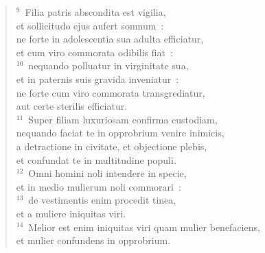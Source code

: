 \begin{flushleft}\begin{verse}${}^{9}$~Filia patris abscondita est vigilia,\\ et sollicitudo ejus aufert somnum~:\\ ne forte in adolescentia sua adulta efficiatur,\\ et cum viro commorata odibilis fiat~:\\
${}^{10}$~nequando polluatur in virginitate sua,\\ et in paternis suis gravida inveniatur~:\\ ne forte cum viro commorata transgrediatur,\\ aut certe sterilis efficiatur.\\
${}^{11}$~Super filiam luxuriosam confirma custodiam,\\ nequando faciat te in opprobrium venire inimicis,\\ a detractione in civitate, et objectione plebis,\\ et confundat te in multitudine populi.\\
${}^{12}$~Omni homini noli intendere in specie,\\ et in medio mulierum noli commorari~:\\
${}^{13}$~de vestimentis enim procedit tinea,\\ et a muliere iniquitas viri.\\
${}^{14}$~Melior est enim iniquitas viri quam mulier benefaciens,\\ et mulier confundens in opprobrium.\end{verse}\end{flushleft}


